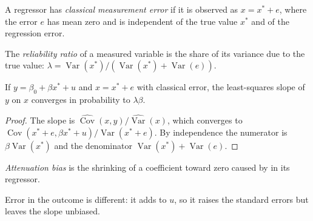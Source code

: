 \begin{definition}\label{def:b2:specification:classical-me}
A regressor has \emph{classical measurement error} if it is observed as $x = x^* + e$,
where the error $e$ has mean zero and is independent of the true value $x^*$ and of the regression error.
\end{definition}

\begin{definition}\label{def:b2:specification:reliability}
The \emph{reliability ratio} of a measured variable is the share of its variance due to the true
value: $\lambda = \operatorname{Var}(x^*)/(\operatorname{Var}(x^*) + \operatorname{Var}(e))$.
\end{definition}

\begin{proposition}[Attenuation]\label{prop:b2:specification:attenuation}
If $y = \beta_0 + \beta x^* + u$ and $x = x^* + e$ with classical error, the least-squares slope of $y$ on $x$ converges in
probability to $\lambda\beta$.
\end{proposition}

\begin{proof}
The slope is $\widehat{\operatorname{Cov}}(x, y)/\widehat{\operatorname{Var}}(x)$, which converges to $\operatorname{Cov}(x^* + e, \beta x^* + u)/\operatorname{Var}(x^* + e)$. By independence the
numerator is $\beta\operatorname{Var}(x^*)$ and the denominator $\operatorname{Var}(x^*) + \operatorname{Var}(e)$.
\end{proof}

\begin{definition}\label{def:b2:specification:attenuation}
\emph{Attenuation bias} is the shrinking of a coefficient toward zero caused by  in its regressor.
\end{definition}

Error in the outcome is different: it adds to $u$, so it raises the standard errors but leaves the slope unbiased.

\label{lst:b2:specification:attenuation}

\label{out:b2:specification:attenuation}

